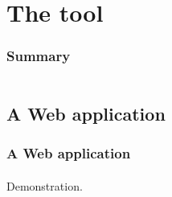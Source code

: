 %
%
\section{The tool}
\begin{frame}
    \frametitle{Summary}
    \begin{columns}[t]
        \begin{column}{5cm}
            \tableofcontents[sections={1-3}, currentsection, hideothersubsections]
        \end{column}
        \begin{column}{5cm}
            \tableofcontents[sections={4-5}, currentsection, hideothersubsections]
        \end{column}
    \end{columns}
\end{frame}
\subsection{A Web application}
\begin{frame}
    \frametitle{A Web application}
    \framesubtitle{}
    Demonstration.
\end{frame}
